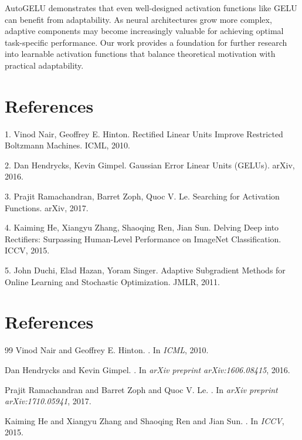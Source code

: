 \documentclass[10pt]{article}
\begin{document}
AutoGELU demonstrates that even well-designed activation functions like GELU can benefit from adaptability. As neural architectures grow more complex, adaptive components may become increasingly valuable for achieving optimal task-specific performance. Our work provides a foundation for further research into learnable activation functions that balance theoretical motivation with practical adaptability.

\section{References}

1. Vinod Nair, Geoffrey E. Hinton. Rectified Linear Units Improve Restricted Boltzmann Machines. ICML, 2010.

2. Dan Hendrycks, Kevin Gimpel. Gaussian Error Linear Units (GELUs). arXiv, 2016.

3. Prajit Ramachandran, Barret Zoph, Quoc V. Le. Searching for Activation Functions. arXiv, 2017.

4. Kaiming He, Xiangyu Zhang, Shaoqing Ren, Jian Sun. Delving Deep into Rectifiers: Surpassing Human-Level Performance on ImageNet Classification. ICCV, 2015.

5. John Duchi, Elad Hazan, Yoram Singer. Adaptive Subgradient Methods for Online Learning and Stochastic Optimization. JMLR, 2011.



\section*{References}
\small
\begin{thebibliography}{99}
Vinod Nair and Geoffrey E. Hinton.
.
\newblock In \emph{ICML}, 2010.


Dan Hendrycks and Kevin Gimpel.
.
\newblock In \emph{arXiv preprint arXiv:1606.08415}, 2016.


Prajit Ramachandran and Barret Zoph and Quoc V. Le.
.
\newblock In \emph{arXiv preprint arXiv:1710.05941}, 2017.


Kaiming He and Xiangyu Zhang and Shaoqing Ren and Jian Sun.
.
\newblock In \emph{ICCV}, 2015.

\end{thebibliography}
\end{document}
